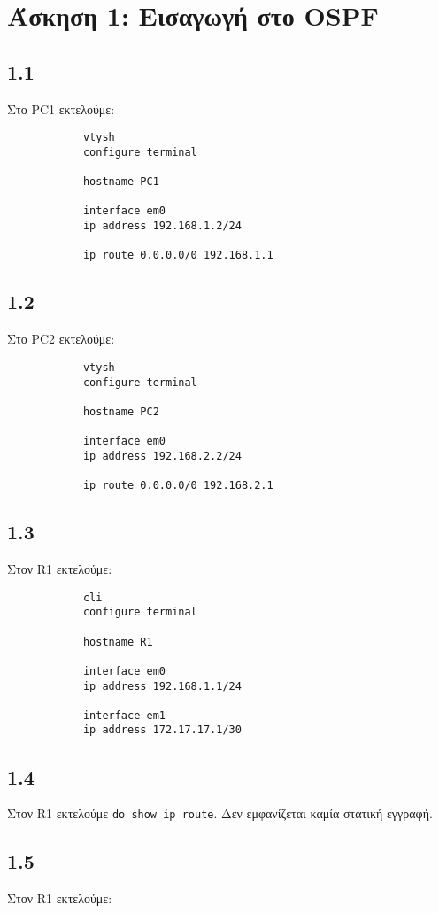 \documentclass[a4paper, 12pt]{article}
\begin{document}
\section*{Άσκηση 1: Εισαγωγή στο OSPF}

	\subsection*{1.1}
		Στο PC1 εκτελούμε:
		
		\begin{verbatim}
			vtysh
			configure terminal
			
			hostname PC1
			
			interface em0
			ip address 192.168.1.2/24
			
			ip route 0.0.0.0/0 192.168.1.1
		\end{verbatim}

	\subsection*{1.2}
		Στο PC2 εκτελούμε:
		
		\begin{verbatim}
			vtysh
			configure terminal
			
			hostname PC2
			
			interface em0
			ip address 192.168.2.2/24
			
			ip route 0.0.0.0/0 192.168.2.1
		\end{verbatim}

	\subsection*{1.3}
		Στον R1 εκτελούμε:
		
		\begin{verbatim}
			cli
			configure terminal
			
			hostname R1
			
			interface em0
			ip address 192.168.1.1/24
			
			interface em1
			ip address 172.17.17.1/30
		\end{verbatim}

	\subsection*{1.4}
		Στον R1 εκτελούμε \verb|do show ip route|. Δεν εμφανίζεται καμία στατική εγγραφή.

	\subsection*{1.5}
		Στον R1 εκτελούμε:
		
\end{document}
